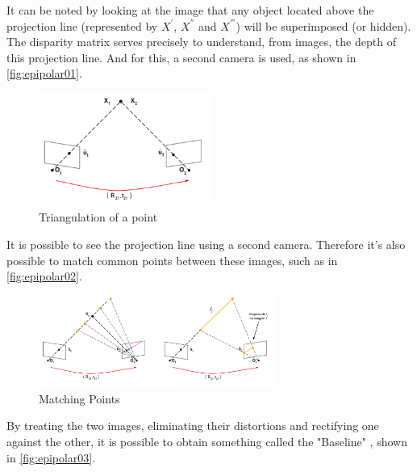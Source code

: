     It can be noted by looking at the image that any object located above the projection line (represented by \(X^{'}\), \(X^{''}\) and \(X^{'''}\)) will be superimposed (or hidden). The disparity matrix serves precisely to understand, from images, the depth of this projection line. And for this, a second camera is used, as shown in \autoref{fig:epipolar01}.

    \begin{figure}[H]
     \caption{\label{fig:epipolar01}
Triangulation of a point}
     \begin{center}
        \includegraphics[width=0.5\textwidth]{images/epipolar1.png}
     \end{center}
    \end{figure}
    
    It is possible to see the projection line using a second camera. Therefore it's also possible to match common points between these images, such as in \autoref{fig:epipolar02}.

    \begin{figure}[H]
     \caption{\label{fig:epipolar02}
Matching Points}
     \begin{center}
        \includegraphics[width=0.7\textwidth]{images/epipolar2.png}
     \end{center}
    \end{figure}
    
    By treating the two images, eliminating their distortions and rectifying one against the other, it is possible to obtain something called the "Baseline" \cite{geometriaEpipolarLeonardo}, shown in \autoref{fig:epipolar03}.

